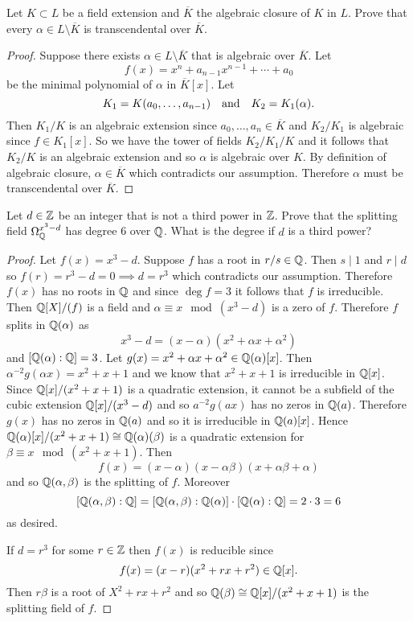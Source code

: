     \begin{ex}{21.32}
        Let $K\subset L$ be a field extension and $\overline{K}$ the algebraic closure of $K$ in $L$. 
        Prove that every $\alpha\in L\setminus\overline{K}$ is transcendental over $\overline{K}$.
    \end{ex}
    \begin{proof}
        Suppose there exists $\alpha\in L\setminus\overline{K}$ that is algebraic over $\overline{K}$.
        Let
        $$f(x)=x^n+a_{n-1}x^{n-1}+\cdots+a_0$$
        be the minimal polynomial of $\alpha$ in $\overline{K}[x]$. Let 
        $$K_1=K(a_0,\dots,a_{n-1})\quad\text{and}\quad K_2=K_1(\alpha).$$
        Then $K_1/K$ is an algebraic extension since $a_0,\dots,a_n\in\overline{K}$ and $K_2/K_1$ is algebraic since $f\in K_1[x]$.
        So we have the tower of fields $K_2/K_1/K$  and it follows that $K_2/K$ is an algebraic extension and so $\alpha$ is algebraic over $K$.
        By definition of algebraic closure, $\alpha\in\overline{K}$ which contradicts our assumption. 
        Therefore $\alpha$ must be transcendental over $\overline{K}$.
    \end{proof}

    \begin{ex}{21.36}
        Let $d\in\mathbb{Z}$ be an integer that is not a third power in $\mathbb{Z}$. Prove that the splitting field $\Omega_{\mathbb{Q}}^{x^3-d}$ has degree 6 over $\mathbb{Q}$.
        What is the degree if $d$ is a third power?
    \end{ex}
    \begin{proof}
        Let $f(x)=x^3-d$. Suppose $f$ has a root in $r/s\in\mathbb{Q}$. Then $s\mid 1$ and $r\mid d$ so $f(r)=r^3-d=0\implies d=r^3$ which contradicts our assumption.
        Therefore $f(x)$ has no roots in $\mathbb{Q}$ and since $\deg f=3$ it follows that $f$ is irreducible. Then $\mathbb{Q}[X]/(f)$ is a field and $\alpha\equiv x\mod\left(x^3-d\right)$ is a zero of $f$.
        Therefore $f$ splits in $\mathbb{Q}(\alpha)$ as
        $$x^3-d=(x-\alpha)(x^2+\alpha x+\alpha^2)$$
        and $[\mathbb{Q}(\alpha):\mathbb{Q}]=3$. Let $g(x)=x^2+\alpha x+\alpha^2\in\mathbb{Q}(\alpha)[x]$. Then $\alpha^{-2}g(\alpha x)=x^2+x+1$ and we know that  $x^2+x+1$ is irreducible in $\mathbb{Q}[x]$. 
        Since $\mathbb{Q}[x]/(x^2+x+1)$ is a quadratic extension, it cannot be a subfield of the cubic extension $\mathbb{Q}[x]/(x^3-d)$ and so $a^{-2}g(ax)$ has no zeros in $\mathbb{Q}(a)$.
        Therefore $g(x)$ has no zeros in $\mathbb{Q}(a)$ and so it is irreducible in $\mathbb{Q}(a)[x]$. Hence $\mathbb{Q}(\alpha)[x]/(x^2+x+1)\cong\mathbb{Q}(\alpha)(\beta)$ is a quadratic extension for $\beta\equiv x\mod\left(x^2+x+1\right)$.
        Then 
        $$f(x)=(x-\alpha)(x-\alpha\beta)(x+\alpha\beta+\alpha)$$
        and so $\mathbb{Q}(\alpha, \beta)$ is the splitting of $f$.
        Moreover
        $$[\mathbb{Q}(\alpha, \beta):\mathbb{Q}]=[\mathbb{Q}(\alpha,\beta):\mathbb{Q}(\alpha)]\cdot[\mathbb{Q}(\alpha):\mathbb{Q}]=2\cdot 3= 6$$
        as desired.

        If $d=r^3$ for some $r\in\mathbb{Z}$ then $f(x)$ is reducible since
        $$f(x)=(x-r)(x^2+rx+r^2)\in\mathbb{Q}[x].$$
        Then $r\beta$ is a root of $X^2+rx+r^2$ and so $\mathbb{Q}(\beta)\cong\mathbb{Q}[x]/(x^2+x+1)$ is the splitting field of $f$.
    \end{proof}

